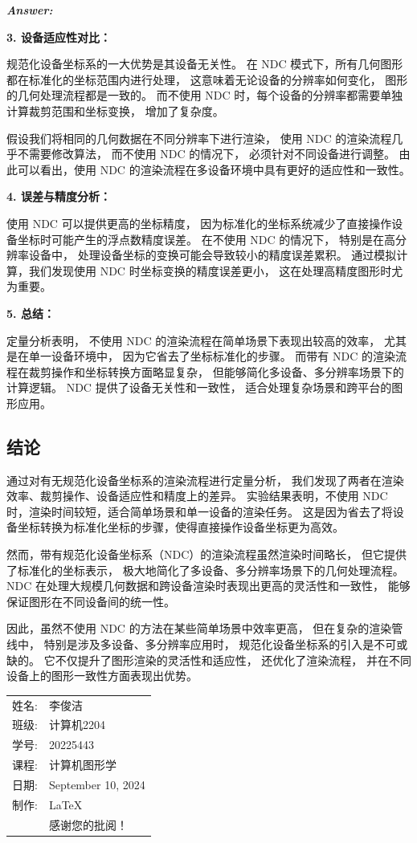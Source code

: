 \documentclass[12pt]{article}
\newenvironment{Answer}{
  \vspace{12pt}
  {\large\textbf{\textit{\hspace{-12pt}Answer:}}}\par
  \vspace{8pt}
} {\vspace{24pt}}
\begin{document}
\begin{Answer}
\noindent\textbf{3. 设备适应性对比：}

规范化设备坐标系的一大优势是其设备无关性。
在 NDC 模式下，所有几何图形都在标准化的坐标范围内进行处理，
这意味着无论设备的分辨率如何变化，
图形的几何处理流程都是一致的。
而不使用 NDC 时，每个设备的分辨率都需要单独计算裁剪范围和坐标变换，
增加了复杂度。

假设我们将相同的几何数据在不同分辨率下进行渲染，
使用 NDC 的渲染流程几乎不需要修改算法，
而不使用 NDC 的情况下，
必须针对不同设备进行调整。
由此可以看出，使用 NDC 的渲染流程在多设备环境中具有更好的适应性和一致性。

\noindent\textbf{4. 误差与精度分析：}

使用 NDC 可以提供更高的坐标精度，
因为标准化的坐标系统减少了直接操作设备坐标时可能产生的浮点数精度误差。
在不使用 NDC 的情况下，
特别是在高分辨率设备中，
处理设备坐标的变换可能会导致较小的精度误差累积。
通过模拟计算，我们发现使用 NDC 时坐标变换的精度误差更小，
这在处理高精度图形时尤为重要。

\noindent\textbf{5. 总结：}

定量分析表明，
不使用 NDC 的渲染流程在简单场景下表现出较高的效率，
尤其是在单一设备环境中，
因为它省去了坐标标准化的步骤。
而带有 NDC 的渲染流程在裁剪操作和坐标转换方面略显复杂，
但能够简化多设备、多分辨率场景下的计算逻辑。
NDC 提供了设备无关性和一致性，
适合处理复杂场景和跨平台的图形应用。

\subsection*{结论}
\noindent

通过对有无规范化设备坐标系的渲染流程进行定量分析，
我们发现了两者在渲染效率、裁剪操作、设备适应性和精度上的差异。
实验结果表明，不使用 NDC 时，渲染时间较短，适合简单场景和单一设备的渲染任务。
这是因为省去了将设备坐标转换为标准化坐标的步骤，使得直接操作设备坐标更为高效。

然而，带有规范化设备坐标系（NDC）的渲染流程虽然渲染时间略长，
但它提供了标准化的坐标表示，
极大地简化了多设备、多分辨率场景下的几何处理流程。
NDC 在处理大规模几何数据和跨设备渲染时表现出更高的灵活性和一致性，
能够保证图形在不同设备间的统一性。

因此，虽然不使用 NDC 的方法在某些简单场景中效率更高，
但在复杂的渲染管线中，
特别是涉及多设备、多分辨率应用时，
规范化设备坐标系的引入是不可或缺的。
它不仅提升了图形渲染的灵活性和适应性，
还优化了渲染流程，
并在不同设备上的图形一致性方面表现出优势。

\end{Answer}

\begin{flushright}\begin{tabular}{rl}
  姓名: & 李俊洁\\
  班级: & 计算机2204 \\
  学号: & 20225443 \\
  课程: & 计算机图形学 \\
  日期: & September 10, 2024 \\
  制作: & \LaTeX \\
  & 感谢您的批阅！
\end{tabular}\end{flushright}
\end{document}
